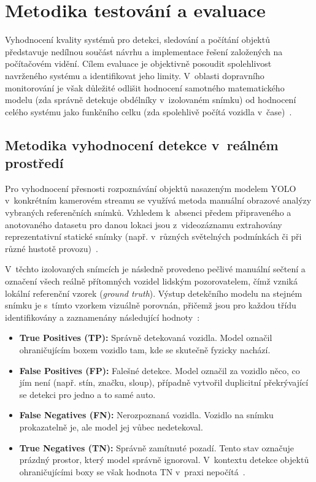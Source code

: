 \section{Metodika testování a evaluace}
Vyhodnocení kvality systémů pro detekci, sledování a počítání objektů představuje nedílnou součást návrhu a implementace řešení založených na počítačovém vidění. Cílem evaluace je objektivně posoudit spolehlivost navrženého systému a identifikovat jeho limity. V~oblasti dopravního monitorování je však důležité odlišit hodnocení samotného matematického modelu (zda správně detekuje obdélníky v~izolovaném snímku) od hodnocení celého systému jako funkčního celku (zda spolehlivě počítá vozidla v~čase)~\cite{szeliski_computer_vision, zhou_traffic_survey_2024}.

\subsection{Metodika vyhodnocení detekce v~reálném prostředí}
Pro vyhodnocení přesnosti rozpoznávání objektů nasazeným modelem YOLO v~konkrétním kamerovém streamu se využívá metoda manuální obrazové analýzy vybraných referenčních snímků. Vzhledem k~absenci předem připraveného a anotovaného datasetu pro danou lokaci jsou z~videozáznamu extrahovány reprezentativní statické snímky (např. v~různých světelných podmínkách či při různé hustotě provozu)~\cite{zhou_traffic_survey_2024, mdpi_roi_tracking_2022}.

V~těchto izolovaných snímcích je následně provedeno pečlivé manuální sečtení a označení všech reálně přítomných vozidel lidským pozorovatelem, čímž vzniká lokální referenční vzorek (\textit{ground truth}). Výstup detekčního modelu na stejném snímku je s~tímto vzorkem vizuálně porovnán, přičemž jsou pro každou třídu identifikovány a zaznamenány následující hodnoty~\cite{szeliski_computer_vision, terven_yolo_review_2023}:
\begin{itemize}
    \item \textbf{True Positives (TP):} Správně detekovaná vozidla. Model označil ohraničujícím boxem vozidlo tam, kde se skutečně fyzicky nachází.
    \item \textbf{False Positives (FP):} Falešné detekce. Model označil za vozidlo něco, co jím není (např. stín, značku, sloup), případně vytvořil duplicitní překrývající se detekci pro jedno a to samé auto.
    \item \textbf{False Negatives (FN):} Nerozpoznaná vozidla. Vozidlo na snímku prokazatelně je, ale model jej vůbec nedetekoval.
    \item \textbf{True Negatives (TN):} Správně zamítnuté pozadí. Tento stav označuje prázdný prostor, který model správně ignoroval. V~kontextu detekce objektů ohraničujícími boxy se však hodnota TN v~praxi nepočítá~\cite{terven_yolo_review_2023}. 
\end{itemize}

